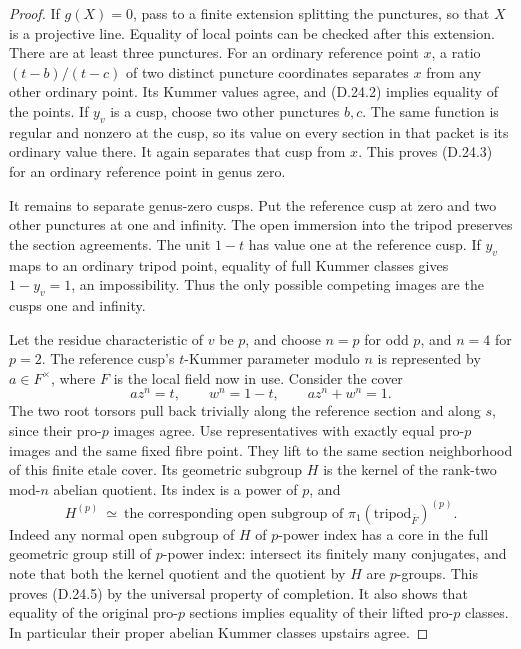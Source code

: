 \begin{proof}
If \(g(X)=0\), pass to a finite extension
splitting the punctures, so that \(X\)
is a projective line. Equality of local
points can be checked after this extension.
There are at least three punctures. For
an ordinary reference point \(x\), a ratio
\((t-b)/(t-c)\) of two distinct puncture
coordinates separates \(x\) from any
other ordinary point. Its Kummer values
agree, and (D.24.2) implies equality of
the points. If \(y_v\) is a cusp, choose
two other punctures \(b,c\). The same
function is regular and nonzero at the
cusp, so its value on every section in
that packet is its ordinary value there.
It again separates that cusp from \(x\).
This proves (D.24.3) for an ordinary
reference point in genus zero.

It remains to separate genus-zero cusps.
Put the reference cusp at zero and two
other punctures at one and infinity. The
open immersion into the tripod preserves
the section agreements. The unit \(1-t\)
has value one at the reference cusp. If
\(y_v\) maps to an ordinary tripod point,
equality of full Kummer classes gives
\(1-y_v=1\), an impossibility. Thus the
only possible competing images are the
cusps one and infinity.

Let the residue characteristic of \(v\)
be \(p\), and choose \(n=p\) for odd
\(p\), and \(n=4\) for \(p=2\). The
reference cusp's \(t\)-Kummer parameter
modulo \(n\) is represented by
\(a\in F^\times\), where \(F\) is the
local field now in use. Consider the cover
\[
       a z^n=t,\qquad w^n=1-t,
       \qquad a z^n+w^n=1.                        \tag{D.24.4}
\]
The two root torsors pull back trivially
along the reference section and along
\(s\), since their pro-\(p\) images agree.
Use representatives with exactly equal
pro-\(p\) images and the same fixed fibre
point. They lift to the same section
neighborhood of this finite etale cover.
Its geometric subgroup \(H\) is the
kernel of the rank-two mod-\(n\) abelian
quotient. Its index is a power of \(p\),
and
\[
 H^{(p)}\ \simeq\
 \text{the corresponding open subgroup of }
 \pi_1(\text{tripod}_{\bar F})^{(p)}.            \tag{D.24.5}
\]
Indeed any normal open subgroup of \(H\)
of \(p\)-power index has a core in the
full geometric group still of \(p\)-power
index: intersect its finitely many
conjugates, and note that both the kernel
quotient and the quotient by \(H\) are
\(p\)-groups. This proves (D.24.5) by
the universal property of completion.
It also shows that equality of the
original pro-\(p\) sections implies equality
of their lifted pro-\(p\) classes. In
particular their proper abelian Kummer
classes upstairs agree.


\end{proof}
